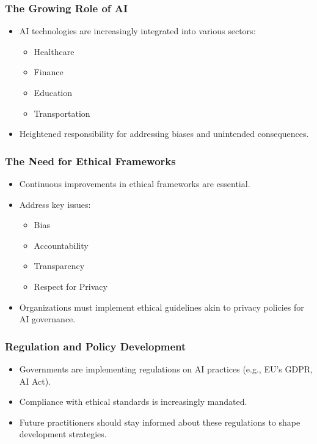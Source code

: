 \documentclass[aspectratio=169]{beamer}
\begin{document}
\begin{frame}[fragile]
  \frametitle{The Growing Role of AI}
  \begin{itemize}
    \item AI technologies are increasingly integrated into various sectors:
    \begin{itemize}
      \item Healthcare
      \item Finance
      \item Education
      \item Transportation
    \end{itemize}
    \item Heightened responsibility for addressing biases and unintended consequences.
  \end{itemize}
\end{frame}

\begin{frame}[fragile]
  \frametitle{The Need for Ethical Frameworks}
  \begin{itemize}
    \item Continuous improvements in ethical frameworks are essential.
    \item Address key issues:
    \begin{itemize}
      \item Bias
      \item Accountability
      \item Transparency
      \item Respect for Privacy
    \end{itemize}
    \item Organizations must implement ethical guidelines akin to privacy policies for AI governance.
  \end{itemize}
\end{frame}

\begin{frame}[fragile]
  \frametitle{Regulation and Policy Development}
  \begin{itemize}
    \item Governments are implementing regulations on AI practices (e.g., EU’s GDPR, AI Act).
    \item Compliance with ethical standards is increasingly mandated.
    \item Future practitioners should stay informed about these regulations to shape development strategies.
  \end{itemize}
\end{frame}
\end{document}
